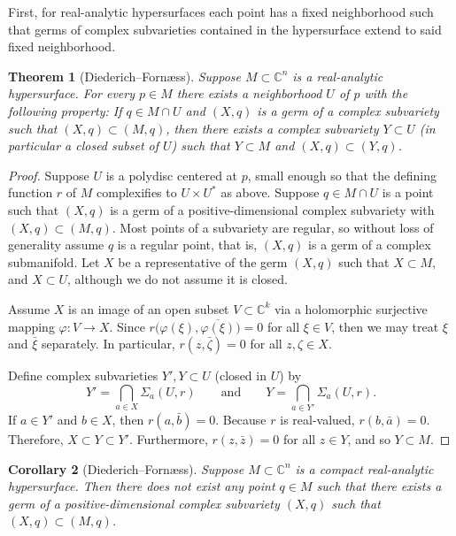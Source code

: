 \documentclass[12pt,openany]{book}
\newcommand{\C}{{\mathbb{C}}}
\theoremstyle{plain}
\newtheorem{thm}{Theorem}[section]
\newtheorem{cor}[thm]{Corollary}
\theoremstyle{remark}
\theoremstyle{definition}
\theoremstyle{exercise}
\theoremstyle{example}
\begin{document}
First, for real-analytic hypersurfaces each point has a fixed neighborhood
such that germs of complex subvarieties contained in the hypersurface extend
to said fixed neighborhood.

\begin{thm}[Diederich--Forn\ae ss]
\pagebreak[2]
Suppose $M \subset \C^n$ is a real-analytic hypersurface.  For every
$p \in M$ there exists a neighborhood $U$ of $p$ with the following
property:
If $q \in M \cap U$ and
$(X,q)$ is a germ of a complex subvariety
such that $(X,q) \subset (M,q)$,
then there exists a complex subvariety $Y \subset U$ (in
particular a closed subset of $U$) such that $Y \subset M$ and $(X,q)
\subset (Y,q)$.
\end{thm}

\begin{proof}
Suppose $U$ is a polydisc centered at $p$,
small enough so that the defining function
$r$ of $M$ complexifies to $U \times U^*$ as above.
Suppose $q \in M \cap U$ is a point such that $(X,q)$ is a germ of a
positive-dimensional complex subvariety with $(X,q) \subset (M,q)$.
Most points of a subvariety are regular, so
without loss of generality assume $q$ is a regular point, that is,
$(X,q)$ is a germ of a complex submanifold.
Let $X$ be a representative of the germ $(X,q)$ such that $X \subset M$,
and $X \subset U$, although we do not assume it is closed.

Assume $X$ is an
image of an open subset $V \subset \C^k$ via a holomorphic surjective mapping $\varphi \colon V \to
X$.  Since $r\bigl(\varphi(\xi),\overline{\varphi(\xi)}\bigr) = 0$
for all $\xi \in V$, then we may treat $\xi$ and $\bar{\xi}$ separately.
In particular,
$r(z,\bar{\zeta}) = 0$ for all $z,\zeta \in X$.

Define complex subvarieties $Y', Y \subset U$ (closed in $U$) by
\begin{equation*}
Y' = \bigcap_{a \in X} \Sigma_a(U,r)
\qquad \text{and} \qquad
Y = \bigcap_{a \in Y'} \Sigma_a(U,r) .
\end{equation*}
If $a \in Y'$ and $b \in X$, then $r(a,\bar{b}) = 0$.
Because $r$ is real-valued,
$r(b,\bar{a}) = 0$.  Therefore,
$X \subset Y \subset Y'$.  Furthermore, $r(z,\bar{z}) = 0$
for all $z \in Y$, and so $Y \subset M$.
\end{proof}

\begin{cor}[Diederich--Forn\ae ss]
Suppose $M \subset \C^n$ is a compact real-analytic hypersurface.
Then there does not exist any point $q \in M$ such that
there exists a germ of a positive-dimensional complex subvariety
$(X,q)$ such that $(X,q) \subset (M,q)$.
\end{cor}
\end{document}

